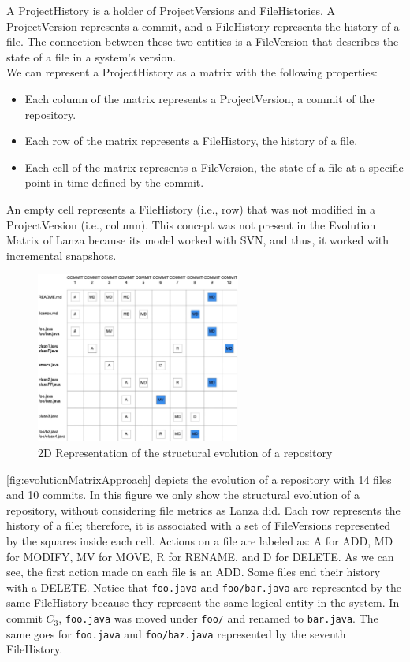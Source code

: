 A ProjectHistory is a holder of ProjectVersions and FileHistories. 
A ProjectVersion represents a commit, and a FileHistory represents the history of a file. 
The connection between these two entities is a FileVersion that describes the state of a file in a system's version. \\
We can represent a ProjectHistory as a matrix with the following properties: 
\begin{itemize}
    \item Each column of the matrix represents a ProjectVersion, a commit of the repository. 
    \item Each row of the matrix represents a FileHistory, the history of a file. 
    \item Each cell of the matrix represents a FileVersion, the state of a file at a specific point in time defined by the commit. 
\end{itemize}

An empty cell represents a FileHistory (i.e., row) that was not modified in a ProjectVersion (i.e., column). 
This concept was not present in the Evolution Matrix of Lanza because its model worked with SVN, and thus, it worked with incremental snapshots.  

\begin{figure}[h]
    \center
    \includegraphics[width=0.6\textwidth]{2DMatrix.jpg}
    \caption{2D Representation of the structural evolution of a repository}
    \label{fig:evolutionMatrixApproach}
\end{figure}
\autoref{fig:evolutionMatrixApproach} depicts the evolution of a repository with 14 files and 10 commits. In this figure we only show the structural evolution of a repository, without considering file metrics as Lanza did. 
Each row represents the history of a file; therefore, it is associated with a set of FileVersions represented by the squares inside each cell. Actions on a file are labeled as: A for ADD, MD for MODIFY, MV for MOVE, R for RENAME, and D for DELETE.
As we can see, the first action made on each file is an ADD. Some files end their history with a DELETE. Notice that \texttt{foo.java} and \texttt{foo/bar.java} are represented by the same FileHistory because they represent the same logical entity in the system. 
In commit $C_3$, \texttt{foo.java} was moved under \texttt{foo/} and renamed to  \texttt{bar.java}.
The same goes for \texttt{foo.java} and \texttt{foo/baz.java} represented by the seventh FileHistory.

